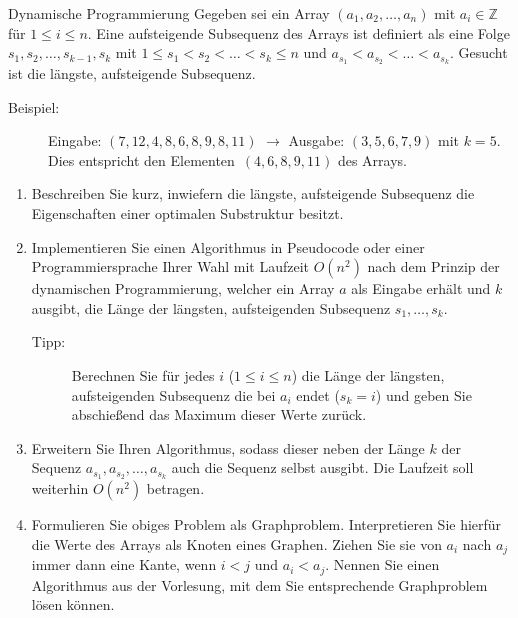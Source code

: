 \documentclass[11pt,a4paper]{article}
\begin{document}
\begin{aufgabe}{3}{Dynamische Programmierung}
    Gegeben sei ein Array $(a_1, a_2, \ldots, a_n)$ mit $a_i \in \mathbb{Z}$ für $1 \leq i \leq n$.
    Eine aufsteigende Subsequenz des Arrays ist definiert als eine Folge $s_1, s_2, \ldots, s_{k - 1}, s_k$ mit $1 \leq s_1 < s_2 < \ldots < s_k \leq n$ und $a_{s_1} < a_{s_2} < \ldots < a_{s_k}$.
    Gesucht ist die längste, aufsteigende Subsequenz.
    \begin{description}
        \item[Beispiel:] Eingabe: $(7, 12, 4, 8, 6, 8, 9, 8, 11)$ $\rightarrow$ Ausgabe: $(3, 5, 6, 7, 9)$ mit $k = 5$. Dies entspricht den Elementen~$(4, 6, 8, 9, 11)$ des Arrays.
    \end{description}
    \begin{enumerate}[label=\alph*)]
        \item\label{optimal_substructure} Beschreiben Sie kurz, inwiefern die längste, aufsteigende Subsequenz die Eigenschaften einer optimalen Substruktur besitzt.
        \item\label{dynamic} Implementieren Sie einen Algorithmus in Pseudocode oder einer Programmiersprache Ihrer Wahl mit Laufzeit $O(n^2)$ nach dem Prinzip der dynamischen Programmierung, welcher ein Array $a$ als Eingabe erhält und $k$ ausgibt, die Länge der längsten, aufsteigenden Subsequenz $s_1, \ldots, s_k$.
        \begin{description}
            \item[Tipp:] Berechnen Sie für jedes $i$ ($1 \leq i \leq n$) die Länge der längsten, aufsteigenden Subsequenz die bei $a_i$ endet ($s_k = i$) und geben Sie abschießend das Maximum dieser Werte zurück.
        \end{description}
        \item Erweitern Sie Ihren Algorithmus, sodass dieser neben der Länge $k$ der Sequenz $a_{s_1}, a_{s_2}, \ldots, a_{s_k}$ auch die Sequenz selbst ausgibt.
        Die Laufzeit soll weiterhin $O(n^2)$ betragen.
        \item
        Formulieren Sie obiges Problem als Graphproblem.
        Interpretieren Sie hierfür die Werte des Arrays als Knoten eines Graphen.
        Ziehen Sie sie von $a_i$ nach $a_j$ immer dann eine Kante, wenn $i < j$ und $a_i < a_j$.
        Nennen Sie einen Algorithmus aus der Vorlesung, mit dem Sie entsprechende Graphproblem lösen können.
    \end{enumerate}
\end{aufgabe}
\end{document}
